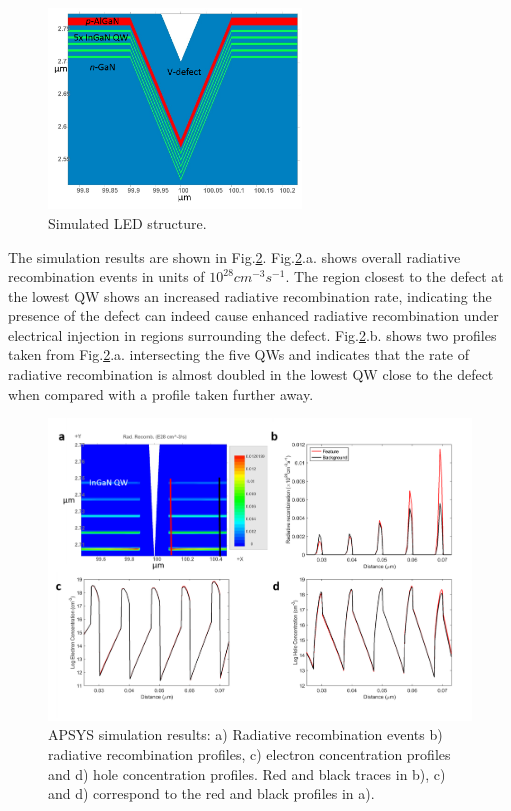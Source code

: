 \begin{figure}[h]
	\centering
	\includegraphics[width=0.6\textwidth]{Figs/Ch3/Sim}
	\caption[h] {Simulated LED structure.}
	\label{simsetup}
\end{figure}
\FloatBarrier 

The simulation results are shown in Fig.\ref{simresults}. Fig.\ref{simresults}.a. shows overall radiative recombination events in units of $10^{28} cm^{-3}s^{-1}$. The region closest to the defect at the lowest QW shows an increased radiative recombination rate, indicating the presence of the defect can indeed cause enhanced radiative recombination under electrical injection in regions surrounding the defect. Fig.\ref{simresults}.b. shows two profiles taken from Fig.\ref{simresults}.a. intersecting the five QWs and indicates that the rate of radiative recombination is almost doubled in the lowest QW close to the defect when compared with a profile taken further away.

\begin{figure}[h]
	\centering
	\includegraphics[width=1\textwidth]{Figs/Ch3/simresults}
	\caption[h] {APSYS simulation results: a) Radiative recombination events b) radiative recombination profiles, c) electron concentration profiles and d) hole concentration profiles. Red and black traces in b), c) and d) correspond to the red and black profiles in a).}
	\label{simresults}
\end{figure}
\FloatBarrier 

